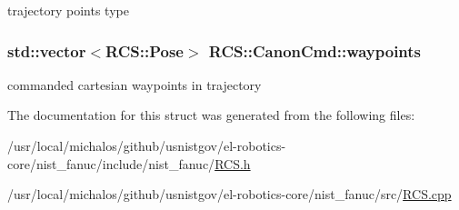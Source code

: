 trajectory points type \hypertarget{structRCS_1_1CanonCmd_a1f7fdffabe34bcb3f0afd42f60040648}{
\subsubsection[{waypoints}]{\setlength{\rightskip}{0pt plus 5cm}std\-::vector$<${\bf R\-C\-S\-::\-Pose}$>$ R\-C\-S\-::\-Canon\-Cmd\-::waypoints}}\label{structRCS_1_1CanonCmd_a1f7fdffabe34bcb3f0afd42f60040648}
commanded cartesian waypoints in trajectory 

The documentation for this struct was generated from the following files\-:\begin{DoxyCompactItemize}
\item 
/usr/local/michalos/github/usnistgov/el-\/robotics-\/core/nist\-\_\-fanuc/include/nist\-\_\-fanuc/\hyperlink{RCS_8h}{R\-C\-S.\-h}\item 
/usr/local/michalos/github/usnistgov/el-\/robotics-\/core/nist\-\_\-fanuc/src/\hyperlink{RCS_8cpp}{R\-C\-S.\-cpp}\end{DoxyCompactItemize}
